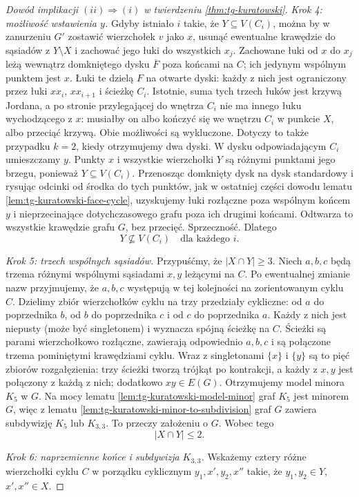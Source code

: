 \begin{proof}[Dowód implikacji
\texorpdfstring{$(ii)\Rightarrow(i)$}{(ii) => (i)}
w twierdzeniu \ref{thm:tg-kuratowski}]
\emph{Krok 4:
możliwość wstawienia $y$.}
Gdyby istniało $i$
takie, że
$Y\subseteq V(C_i)$,
można by w zanurzeniu
$G'$ zostawić
wierzchołek $v$
jako $x$, usunąć
ewentualne krawędzie
do sąsiadów z
$Y\setminus X$
i zachować
jego łuki do
wszystkich $x_j$.
Zachowane łuki od $x$ do $x_j$ leżą wewnątrz
domkniętego dysku $\overline F$ poza końcami
na $C$; ich jedynym wspólnym punktem jest $x$.
Łuki te dzielą $F$ na otwarte dyski: każdy z nich
jest ograniczony przez łuki $xx_i$, $xx_{i+1}$
i ścieżkę $C_i$. Istotnie, suma tych trzech łuków
jest krzywą Jordana, a po stronie przylegającej
do wnętrza $C_i$ nie ma innego łuku wychodzącego
z $x$: musiałby on albo kończyć się we wnętrzu
$C_i$ w punkcie $X$, albo przeciąć krzywą.
Obie możliwości są wykluczone. Dotyczy to także
przypadku $k=2$, kiedy otrzymujemy dwa dyski.
W dysku odpowiadającym $C_i$ umieszczamy $y$.
Punkty $x$ i wszystkie wierzchołki $Y$ są różnymi
punktami jego brzegu, ponieważ $Y\subseteq V(C_i)$.
Przenosząc domknięty dysk na dysk standardowy
i rysując odcinki od środka do tych punktów,
jak w ostatniej części dowodu lematu
\ref{lem:tg-kuratowski-face-cycle}, uzyskujemy łuki
rozłączne poza wspólnym końcem $y$ i nieprzecinające
dotychczasowego grafu poza ich drugimi końcami.
Odtwarza to
wszystkie krawędzie
grafu $G$,
bez przecięć.
Sprzeczność.
Dlatego
\[
Y\not\subseteq V(C_i)
\quad\text{dla każdego }i.
\tag{*}
\]

\emph{Krok 5:
trzech wspólnych sąsiadów.}
Przypuśćmy, że
$|X\cap Y|\geq3$.
Niech $a,b,c$
będą trzema różnymi
wspólnymi sąsiadami
$x,y$ leżącymi na $C$.
Po ewentualnej zmianie nazw przyjmujemy, że $a,b,c$
występują w tej kolejności na zorientowanym cyklu $C$.
Dzielimy zbiór wierzchołków cyklu na trzy przedziały
cykliczne: od $a$ do poprzednika $b$, od $b$ do
poprzednika $c$ i od $c$ do poprzednika $a$.
Każdy z nich jest niepusty (może być singletonem)
i wyznacza spójną ścieżkę na $C$. Ścieżki są
parami wierzchołkowo rozłączne, zawierają odpowiednio
$a,b,c$ i są połączone trzema pominiętymi
krawędziami cyklu.
Wraz z singletonami
$\{x\}$ i $\{y\}$
są to pięć zbiorów
rozgałęzienia:
trzy ścieżki tworzą
trójkąt po kontrakcji,
a każdy z $x,y$
jest połączony
z każdą z nich;
dodatkowo $xy\in E(G)$.
Otrzymujemy
model minora $K_5$ w $G$. Na mocy lematu
\ref{lem:tg-kuratowski-model-minor} graf $K_5$ jest
minorem $G$, więc z lematu
\ref{lem:tg-kuratowski-minor-to-subdivision}
graf $G$ zawiera subdywizję $K_5$ lub $K_{3,3}$.
To przeczy
założeniu o $G$.
Wobec tego
\[
|X\cap Y|\leq2.
\tag{**}
\]

\emph{Krok 6:
naprzemienne końce
i subdywizja $K_{3,3}$.}
Wskażemy cztery
różne wierzchołki
cyklu $C$ w porządku
cyklicznym
$y_1,x',y_2,x''$
takie, że
$y_1,y_2\in Y$,
$x',x''\in X$.


\end{proof}
